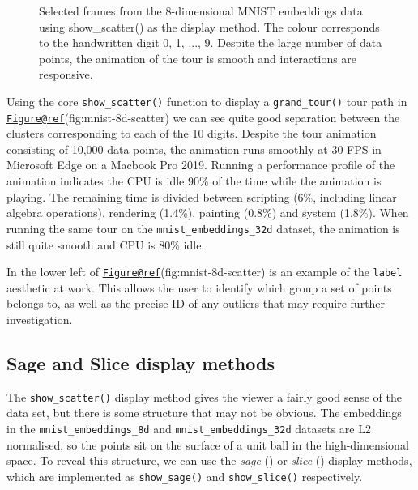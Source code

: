 \begin{Schunk}
\begin{figure}
{}

\caption[Selected frames from the 8-dimensional MNIST embeddings data using show\_scatter() as the display method]{Selected frames from the 8-dimensional MNIST embeddings data using show\_scatter() as the display method. The colour corresponds to the handwritten digit 0, 1, ..., 9. Despite the large number of data points, the animation of the tour is smooth and interactions are responsive.}\label{fig:mnist-8d-scatter}
\end{figure}
\end{Schunk}

Using the core \texttt{show\_scatter()} function to display a
\texttt{grand\_tour()} tour path in
\href{mailto:Figure@ref}{\nolinkurl{Figure@ref}}(fig:mnist-8d-scatter)
we can see quite good separation between the clusters corresponding to
each of the 10 digits. Despite the tour animation consisting of 10,000
data points, the animation runs smoothly at 30 FPS in Microsoft Edge on
a Macbook Pro 2019. Running a performance profile of the animation
indicates the CPU is idle 90\% of the time while the animation is
playing. The remaining time is divided between scripting (6\%, including
linear algebra operations), rendering (1.4\%), painting (0.8\%) and
system (1.8\%). When running the same tour on the
\texttt{mnist\_embeddings\_32d} dataset, the animation is still quite
smooth and CPU is 80\% idle.

In the lower left of
\href{mailto:Figure@ref}{\nolinkurl{Figure@ref}}(fig:mnist-8d-scatter)
is an example of the \texttt{label} aesthetic at work. This allows the
user to identify which group a set of points belongs to, as well as the
precise ID of any outliers that may require further investigation.

\hypertarget{sage-and-slice-display-methods}{%
\subsection{Sage and Slice display
methods}\label{sage-and-slice-display-methods}}

The \texttt{show\_scatter()} display method gives the viewer a fairly
good sense of the data set, but there is some structure that may not be
obvious. The embeddings in the \texttt{mnist\_embeddings\_8d} and
\texttt{mnist\_embeddings\_32d} datasets are L2 normalised, so the
points sit on the surface of a unit ball in the high-dimensional space.
To reveal this structure, we can use the \emph{sage}
(\citet{laa2021burning}) or \emph{slice} (\citet{laa2020slice}) display
methods, which are implemented as \texttt{show\_sage()} and
\texttt{show\_slice()} respectively.

